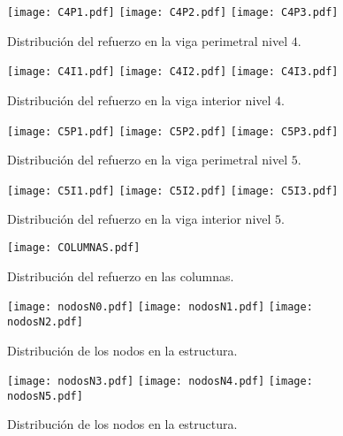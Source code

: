 \newpage

\begin{figure}[htbp]
\centering
			\texttt{[image: C4P1.pdf]}
			\texttt{[image: C4P2.pdf]}
			\texttt{[image: C4P3.pdf]}						
	\caption{Distribuci\'on del refuerzo en la viga perimetral nivel $4$.}
	\label{fig:apendis17}
\end{figure}

\newpage

\begin{figure}[htbp]
\centering
			\texttt{[image: C4I1.pdf]}
			\texttt{[image: C4I2.pdf]}
			\texttt{[image: C4I3.pdf]}						
	\caption{Distribuci\'on del refuerzo en la viga interior nivel $4$.}
	\label{fig:apendis18}
\end{figure}

\newpage

\begin{figure}[htbp]
\centering
			\texttt{[image: C5P1.pdf]}
			\texttt{[image: C5P2.pdf]}
			\texttt{[image: C5P3.pdf]}						
	\caption{Distribuci\'on del refuerzo en la viga perimetral nivel $5$.}
	\label{fig:apendis19}
\end{figure}

\newpage

\begin{figure}[htbp]
\centering
			\texttt{[image: C5I1.pdf]}
			\texttt{[image: C5I2.pdf]}
			\texttt{[image: C5I3.pdf]}						
	\caption{Distribuci\'on del refuerzo en la viga interior nivel $5$.}
	\label{fig:apendis20}
\end{figure}

\newpage

\begin{figure}[htbp]
\centering
			\texttt{[image: COLUMNAS.pdf]}
	\caption{Distribuci\'on del refuerzo en las columnas.}
	\label{fig:apendis21}
\end{figure}

\newpage

\begin{figure}[htbp]
\centering
			\texttt{[image: nodosN0.pdf]}
			\texttt{[image: nodosN1.pdf]}
			\texttt{[image: nodosN2.pdf]}			
	\caption{Distribuci\'on de los nodos en la estructura.}
	\label{fig:apendis22}
\end{figure}

\begin{figure}[htbp]
\centering
			\texttt{[image: nodosN3.pdf]}
			\texttt{[image: nodosN4.pdf]}
			\texttt{[image: nodosN5.pdf]}			
	\caption{Distribuci\'on de los nodos en la estructura.}
	\label{fig:apendis23}
\end{figure}

